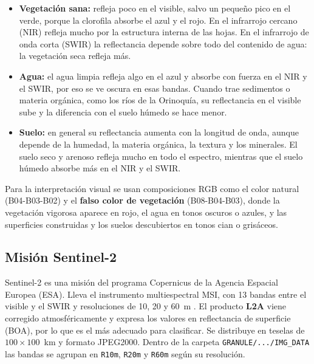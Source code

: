 \documentclass[11pt,letterpaper]{article}
\begin{document}
\begin{itemize}
    \item \textbf{Vegetación sana:} refleja poco en el visible, salvo un pequeño pico en el verde, porque la
    clorofila absorbe el azul y el rojo. En el infrarrojo cercano (NIR) refleja mucho por la estructura
    interna de las hojas. En el infrarrojo de onda corta (SWIR) la reflectancia depende sobre todo del
    contenido de agua: la vegetación seca refleja más.
    \item \textbf{Agua:} el agua limpia refleja algo en el azul y absorbe con fuerza en el NIR y el SWIR,
    por eso se ve oscura en esas bandas. Cuando trae sedimentos o materia orgánica, como los ríos de la
    Orinoquía, su reflectancia en el visible sube y la diferencia con el suelo húmedo se hace menor.
    \item \textbf{Suelo:} en general su reflectancia aumenta con la longitud de onda, aunque depende de la
    humedad, la materia orgánica, la textura y los minerales. El suelo seco y arenoso refleja mucho en todo
    el espectro, mientras que el suelo húmedo absorbe más en el NIR y el SWIR.
\end{itemize}

Para la interpretación visual se usan composiciones RGB como el color natural (B04-B03-B02) y el \textbf{falso color de vegetación} (B08-B04-B03), donde la vegetación vigorosa
aparece en rojo, el agua en tonos oscuros o azules, y las superficies construidas y los suelos descubiertos
en tonos cian o grisáceos.

\subsection{Misión Sentinel-2}
Sentinel-2 es una misión del programa Copernicus de la Agencia Espacial Europea (ESA). Lleva el instrumento
multiespectral MSI, con 13 bandas entre el visible y el SWIR y resoluciones de 10, 20 y 60~m
\citep{drusch2012,esa2015}. El producto \textbf{L2A} viene corregido atmosféricamente y expresa los
valores en reflectancia de superficie (BOA), por lo que es el más adecuado para clasificar. Se distribuye
en teselas de $100\times100$~km y formato JPEG2000. Dentro de la carpeta \texttt{GRANULE/.../IMG\_DATA}
las bandas se agrupan en \texttt{R10m}, \texttt{R20m} y \texttt{R60m} según su resolución.
\end{document}
